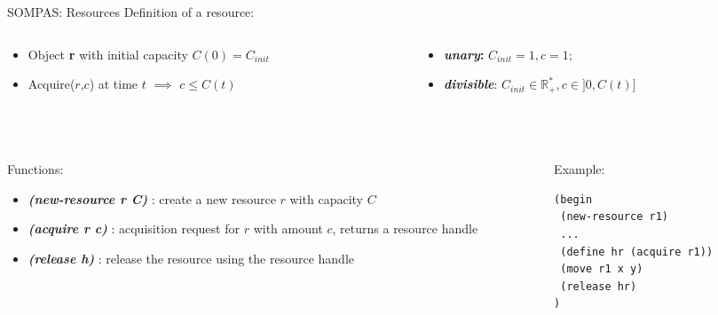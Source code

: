 \begin{frame}[fragile]{SOMPAS: Resources}
    Definition of a resource:
    \begin{columns}
        \begin{column}{0.5\textwidth}
            \begin{itemize}
                \item Object \textbf{r} with initial capacity $C(0) = C_{init} $
                \item Acquire($r$,$c$) at time $t$ $\implies$ $c \leq C(t)$ 
            \end{itemize}
        \end{column}
        \pause
        \begin{column}{0.5\textwidth}
            \begin{itemize}
                \item \textbf{\textit{unary}:} $C_{init} = 1, c = 1$;
                \item \textbf{\textit{divisible}}: $C_{init} \in  \mathbb{R}_+^*, c \in ]0, C(t)]$
            \end{itemize}
        \end{column}
    \end{columns}
    
    ~~

\pause
    \begin{columns}
        \begin{column}{0.6\textwidth}
            Functions:
            \begin{itemize}
                \item \textbf{\textit{(new-resource r C)}} : create a new resource $r$ with capacity $C$
                \item \textbf{\textit{(acquire r c)}} : acquisition request for $r$ with amount $c$, returns a resource handle
                \item \textbf{\textit{(release h)}} : release the resource using the resource handle
            \end{itemize}
        \end{column}
        \pause
        \begin{column}{0.4\textwidth}
        Example: 
            \small
            \lstset{columns=fullflexible}
            \begin{lstlisting}[language = lisp]
(begin
 (new-resource r1)
 ...
 (define hr (acquire r1))
 (move r1 x y)
 (release hr)
)
            \end{lstlisting}
        \end{column}
    \end{columns}
\end{frame}

